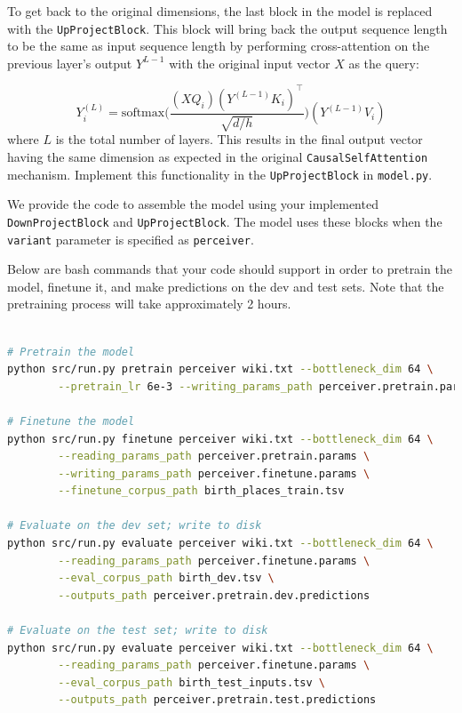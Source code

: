 \begin{parts}
To get back to the original dimensions, the last block in the model is replaced with the \texttt{UpProjectBlock}. This block will bring back the output sequence length to be the same as input sequence length  by performing cross-attention on the previous layer's output $Y^{L-1}$ with the original input vector $X$ as the query:

\begin{equation}\label{eqn:up_proj_attn}
Y_i^{(L)} = \text{softmax}\bigg(\frac{(XQ_i)(Y^{(L-1)}K_i)^\top}{\sqrt{d/h}}\bigg)(Y^{(L-1)}V_i)
\end{equation}
where $L$ is the total number of layers. This results in the final output vector having the same dimension as expected in the original \texttt{CausalSelfAttention} mechanism. Implement this functionality in the \texttt{UpProjectBlock} in \texttt{model.py}.



We provide the code to assemble the model using your implemented \texttt{DownProjectBlock} and \texttt{UpProjectBlock}. The model uses these blocks when the \texttt{variant} parameter is specified as \texttt{perceiver}.


Below are bash commands that your code should support in order to pretrain the model, finetune it, and make predictions on the dev and test sets.
Note that the pretraining process will take approximately 2 hours. 
\clearpage
\begin{lstlisting}[basicstyle=\ttfamily, language=bash]

# Pretrain the model
python src/run.py pretrain perceiver wiki.txt --bottleneck_dim 64 \
        --pretrain_lr 6e-3 --writing_params_path perceiver.pretrain.params
        
# Finetune the model
python src/run.py finetune perceiver wiki.txt --bottleneck_dim 64 \
        --reading_params_path perceiver.pretrain.params \
        --writing_params_path perceiver.finetune.params \
        --finetune_corpus_path birth_places_train.tsv
        
# Evaluate on the dev set; write to disk
python src/run.py evaluate perceiver wiki.txt --bottleneck_dim 64 \
        --reading_params_path perceiver.finetune.params \
        --eval_corpus_path birth_dev.tsv \
        --outputs_path perceiver.pretrain.dev.predictions
        
# Evaluate on the test set; write to disk
python src/run.py evaluate perceiver wiki.txt --bottleneck_dim 64 \
        --reading_params_path perceiver.finetune.params \
        --eval_corpus_path birth_test_inputs.tsv \
        --outputs_path perceiver.pretrain.test.predictions
\end{lstlisting}


\end{parts}
